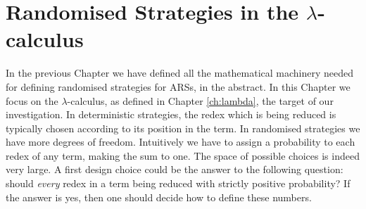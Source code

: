 \chapter{Randomised Strategies in the $\lambda$-calculus}\label{chapter:prostra}
In the previous Chapter we have defined all the mathematical machinery needed for defining randomised strategies for ARSs, in the abstract. In this Chapter we focus on the $\lambda$-calculus, as defined in Chapter \ref{ch:lambda}, the target of our investigation. In deterministic strategies, the redex which is being reduced is typically chosen according to its position in the term. In randomised strategies we have more degrees of freedom. Intuitively we have to assign a probability to each redex of any term, making the sum to one. The space of possible choices is indeed very large. A first design choice could be the answer to the following question: should \emph{every} redex in a term being reduced with strictly positive probability? If the answer is yes, then one should decide how to define these numbers. 
